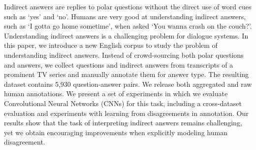 Indirect answers are replies to polar questions without the direct use of word cues such as `yes' and `no'. Humans are very good at understanding indirect answers, such as `I gotta go home sometime', when asked `You wanna crash on the couch?'. Understanding indirect answers is a challenging problem for dialogue systems. In this paper, we introduce a new English corpus to study the problem of understanding indirect answers. Instead of crowd-sourcing both polar questions and answers, we collect questions and indirect answers from transcripts of a prominent TV series and manually annotate them for answer type. The resulting dataset contains 5,930 question-answer pairs. We release both aggregated and raw human annotations. We present a set of experiments in which we evaluate Convolutional Neural Networks (CNNs) for this task, including a cross-dataset evaluation and experiments with learning from disagreements in annotation. Our results show that the task of interpreting indirect answers remains challenging, yet  we obtain encouraging improvements when explicitly modeling human disagreement.
